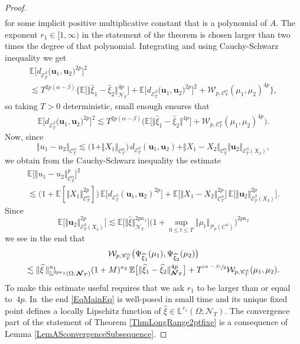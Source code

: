 \documentclass[JEP,XML,SOM,Unicode,published]{cedram}
\newcommand{\psfrac}[2]{\sfrac{(#1)}{#2}}
\theoremstyle{definition}
\newcommand\bbE{\mathbb{E}}
\newcommand{\mcE}{\mathcal{E}}
\newcommand{\mcN}{\mathcal{N}}
\newcommand{\mcP}{\mathcal{P}}
\newcommand\mcW{\mathcal W}
\newcommand{\bbL}{\mathbb{L}}
\newcommand{\bsu}{\boldsymbol{u}}
\newcommand{\scrC}{\ensuremath{\mathscr{C}}}
\newcommand{\dab}{\mcE^\beta_T}
\newcommand{\norme}[1]{\Vert #1 \Vert}
\begin{document}
\begin{proof}
\begin{equation*}
\begin{split}
\end{split} \end{equation*}
for some implicit positive multiplicative constant that is a polynomial of $A$. The exponent $r_1\in[1,\infty)$ in the statement of the theorem is chosen larger than two times the degree of that polynomial. Integrating and using Cauchy-Schwarz inequality we get
\begin{multline*}
\bbE\bigl[d_{\mcE^\beta_T}\bigl(\bsu_1, \bsu_2\bigr)^{2p} \bigr]^2 \\
\lesssim T^{2p(\alpha-\beta)} \bigl\{ \bbE\bigl[ \big\Vert \widehat\xi_1 - \widehat\xi_2\big\Vert_{{{\boldsymbol{\mcN}}_T}}^{4p}\bigr] + \bbE\bigl[ d_{\mcE^\beta_T}\bigl(\bsu_1, \bsu_2\bigr)^{2p} \bigr]^2 + \mcW_{p,\scrC^\alpha_T}(\mu_1,\mu_2)^{4p} \bigr\},
\end{multline*}
so taking $T>0$ deterministic, small enough ensures that
\begin{align*}
\bbE\bigl[ d_{\mcE_T^\beta}\bigl(\bsu_1, \bsu_2\bigr)^{2p} \bigr]^2 \lesssim T^{2p(\alpha-\beta)} \bigl(\bbE\bigl[ \Vert \widehat\xi_1 - \widehat\xi_2\Vert^{4p}\bigr] + \mcW_{p,\scrC^\alpha_T}(\mu_1,\mu_2)^{4p}\bigr).
\end{align*}
Now, since
\[
\norme{u_1-u_2}_{\scrC^\alpha_T} \lesssim \bigl(1+\norme{X_1}_{\scrC_T^\alpha}\bigr) \, d_{\dab}(\bsu_1,\bsu_2) + \norme{X_1-X_2}_{\scrC^\alpha_T} \norme{\bsu_2}_{\dab(X_2)},
\]
we obtain from the Cauchy-Schwarz inequality the estimate
\begin{multline*}
\bbE\bigl[\norme{u_1 - u_2}_{\scrC^\alpha_T}^p\bigr]^2 \\
\lesssim \bigl(1+\bbE[\norme{X_1}_{\scrC_T^\alpha}^{2p}]\bigr) \, \bbE\bigl[d_{\dab}(\bsu_1,\bsu_2)^{2p}\bigr] + \bbE\bigl[\norme{X_1-X_2}_{\scrC^\alpha_T}^{2p}\bigr] \, \bbE\bigl[\norme{\bsu_2}_{\dab(X_2)}^{2p}\bigr].
\end{multline*}
Since
\[
\bbE\bigl[\norme{\bsu_2}_{\dab(X_2)}^{2p}\bigr] \lesssim \bbE\bigl[ \Vert\widehat{\xi}\Vert_{{\boldsymbol{\mcN}}_T}^{2p\kappa_1}\bigr] \bigl(1+\sup_{0\leq t\leq T} \Vert \mu_t\Vert_{\mcP_p(C^\alpha)}\bigr)^{2p\kappa_2}
\]
we see in the end that
\begin{multline*}
\mcW_{p,\scrC^\alpha_T}\bigl( \Psi_{\widehat\xi_1}(\mu_1), \Psi_{\widehat\xi_2}(\mu_2) \bigr) \\
\lesssim \Vert \widehat{\xi}\,\Vert_{\bbL^{2p\kappa_1}(\Omega;\,{\boldsymbol{\mcN}}_T)}^{\kappa_1} (1+M)^{\kappa_2} \, \bbE\bigl[ \Vert \widehat\xi_1 - \widehat\xi_2\Vert_{{{\boldsymbol{\mcN}}_T}}^{4p}\bigr] + T^{\psfrac{\alpha-\beta}{2}} \mcW_{p,\scrC^\alpha_T}(\mu_1,\mu_2).
\end{multline*}
To make this estimate useful requires that we ask $r_1$ to be larger than or equal to~$4p$. In~the end \eqref{EqMainEq} is well-posed in small time and its unique fixed point defines a locally Lipschitz function of $\widehat{\xi}\in \bbL^{r_1}(\Omega; {\boldsymbol{\mcN}}_T)$. The convergence part of the statement of Theorem \ref{ThmLongRange2ptfixe} is a consequence of Lemma \ref{LemASconvergenceSubsequence}.
\end{proof}
\end{document}

